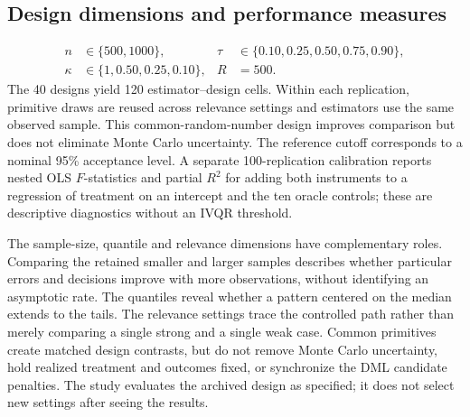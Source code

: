 \subsection{Design dimensions and performance measures}
\label{sec:performance-measures}
\begin{equation}
  \begin{aligned}
    n&\in\{500,1000\},
    &\tau&\in\{0.10,0.25,0.50,0.75,0.90\},\\
    \kappa&\in\{1,0.50,0.25,0.10\},
    &R&=500.
  \end{aligned}
  \label{eq:simulation-design}
\end{equation}
The 40 designs yield 120 estimator--design cells. Within each replication, primitive draws are reused across relevance settings and estimators use the same observed sample. This common-random-number design improves comparison but does not eliminate Monte Carlo uncertainty. The reference cutoff corresponds to a nominal 95\% acceptance level. A separate 100-replication calibration reports nested OLS $F$-statistics and partial $R^2$ for adding both instruments to a regression of treatment on an intercept and the ten oracle controls; these are descriptive diagnostics without an IVQR threshold.

The sample-size, quantile and relevance dimensions have complementary roles. Comparing the retained smaller and larger samples describes whether particular errors and decisions improve with more observations, without identifying an asymptotic rate. The quantiles reveal whether a pattern centered on the median extends to the tails. The relevance settings trace the controlled path rather than merely comparing a single strong and a single weak case. Common primitives create matched design contrasts, but do not remove Monte Carlo uncertainty, hold realized treatment and outcomes fixed, or synchronize the DML candidate penalties. The study evaluates the archived design as specified; it does not select new settings after seeing the results.

